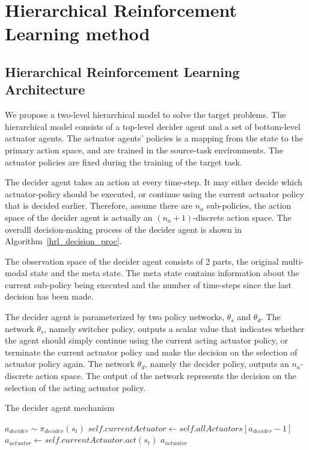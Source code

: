 \section{Hierarchical Reinforcement Learning method}
\subsection{Hierarchical Reinforcement Learning Architecture}
We propose a two-level hierarchical model to solve the target problems. The hierarchical model consists of a top-level decider agent and a set of bottom-level actuator agents. The actuator agents' policies is a mapping from the state to the primary action space, and are trained in the source-task environments. The actuator policies are fixed during the training of the target task.

The decider agent takes an action at every time-step. It may either decide which actuator-policy should be executed, or continue using the current actuator policy that is decided earlier. Therefore, assume there are $n_a$ sub-policies, the action space of the decider agent is actually an $(n_a+1)$-discrete action space. The overalll decision-making process of the decider agent is shown in Algorithm~\ref{hrl_decision_proc}.

The observation space of the decider agent consists of 2 parts, the original multi-modal state and the meta state. The meta state contains information about the current sub-policy being executed and the number of time-steps since the last decision has been made.

The decider agent is parameterized by two policy networks, $\theta_s$ and $\theta_d$. The network $\theta_s$, namely switcher policy, outputs a scalar value that indicates whether the agent should simply continue using the current acting actuator policy, or terminate the current actuator policy and make the decision on the selection of actuator policy again. 
The network $\theta_d$, namely the decider policy, outputs an $n_a$-discrete action space. The output of the network represents the decision on the selection of the acting actuator policy. 



\begin{algorithm}
\caption{The decider agent mechanism}\label{hrl_decision_proc}
\begin{algorithmic}%
\State $a_{decider} \sim \pi_{decider}(s_t)$
 \State $self.currentActuator \gets self.allA
ctuators[a_{decider}-1]$
 \EndIf
\State $a_{actuator} \gets self.currentActuator.act(s_t)$
\State \Return $a_{actuator}$
\EndFunction
\end{algorithmic}
\end{algorithm}


